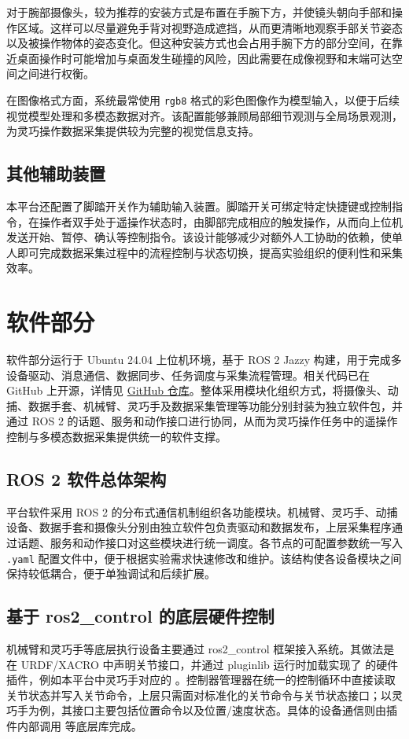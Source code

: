 对于腕部摄像头，较为推荐的安装方式是布置在手腕下方，并使镜头朝向手部和操作区域。这样可以尽量避免手背对视野造成遮挡，从而更清晰地观察手部关节姿态以及被操作物体的姿态变化。但这种安装方式也会占用手腕下方的部分空间，在靠近桌面操作时可能增加与桌面发生碰撞的风险，因此需要在成像视野和末端可达空间之间进行权衡。

在图像格式方面，系统最常使用 \texttt{rgb8} 格式的彩色图像作为模型输入，以便于后续视觉模型处理和多模态数据对齐。该配置能够兼顾局部细节观测与全局场景观测，为灵巧操作数据采集提供较为完整的视觉信息支持。

\subsection{其他辅助装置}
本平台还配置了脚踏开关作为辅助输入装置。脚踏开关可绑定特定快捷键或控制指令，在操作者双手处于遥操作状态时，由脚部完成相应的触发操作，从而向上位机发送开始、暂停、确认等控制指令。该设计能够减少对额外人工协助的依赖，使单人即可完成数据采集过程中的流程控制与状态切换，提高实验组织的便利性和采集效率。

\section{软件部分}
软件部分运行于 Ubuntu 24.04 上位机环境，基于 ROS 2 Jazzy 构建，用于完成多设备驱动、消息通信、数据同步、任务调度与采集流程管理。相关代码已在 GitHub 上开源，详情见 \href{https://github.com/FengErzhong6/ros2_control_system/tree/DataCollect}{GitHub 仓库}。整体采用模块化组织方式，将摄像头、动捕、数据手套、机械臂、灵巧手及数据采集管理等功能分别封装为独立软件包，并通过 ROS 2 的话题、服务和动作接口进行协同，从而为灵巧操作任务中的遥操作控制与多模态数据采集提供统一的软件支撑。

\subsection{ROS 2 软件总体架构}
平台软件采用 ROS 2 的分布式通信机制组织各功能模块。机械臂、灵巧手、动捕设备、数据手套和摄像头分别由独立软件包负责驱动和数据发布，上层采集程序通过话题、服务和动作接口对这些模块进行统一调度。各节点的可配置参数统一写入
\texttt{.yaml} 配置文件中，便于根据实验需求快速修改和维护。该结构使各设备模块之间保持较低耦合，便于单独调试和后续扩展。

\subsection{基于 ros2\_control 的底层硬件控制}
机械臂和灵巧手等底层执行设备主要通过 ros2\_control 框架接入系统。其做法是在 URDF/XACRO 中声明关节接口，并通过 pluginlib 运行时加载实现了  的硬件插件，例如本平台中灵巧手对应的 。控制器管理器在统一的控制循环中直接读取关节状态并写入关节命令，上层只需面对标准化的关节命令与关节状态接口；以灵巧手为例，其接口主要包括位置命令以及位置/速度状态。具体的设备通信则由插件内部调用  等底层库完成。

